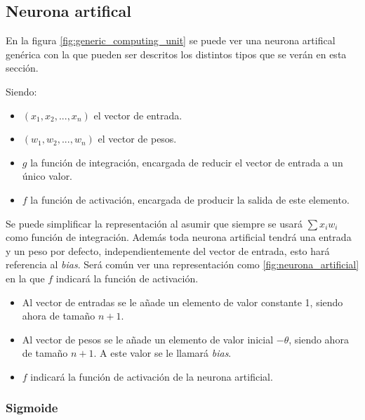\subsection{Neurona artifical}\label{subsec:neurona_artificial}

En la figura \ref{fig:generic_computing_unit} se puede ver una neurona artifical genérica con la que pueden ser descritos los distintos tipos que se verán en esta sección.


Siendo:
\begin{itemize}
\item $ (x_1, x_2, ...,x_n) $ el vector de entrada.
\item $ (w_1, w_2, ...,w_n) $ el vector de pesos.
\item $ g $ la función de integración, encargada de reducir el vector de entrada a un único valor.
\item $ f $ la función de activación, encargada de producir la salida de este elemento.
\end{itemize}

Se puede simplificar la representación al asumir que siempre se usará $ \sum x_i w_i $ como función de integración. Además toda neurona artificial tendrá una entrada y un peso por defecto, independientemente del vector de entrada, esto hará referencia al \textit{bias}. Será común ver una representación como \ref{fig:neurona_artificial} en la que $ f $ indicará la función de activación.


\begin{itemize}
\item Al vector de entradas se le añade un elemento de valor constante 1, siendo ahora de tamaño $ n+1 $.
\item Al vector de pesos se le añade un elemento de valor inicial $ -\theta $, siendo ahora de tamaño $ n+1 $. A este valor se le llamará \textit{bias}.
\item $ f $ indicará la función de activación de la neurona artificial.
\end{itemize}

\subsubsection{Sigmoide}\label{subsubsec:sigmoide}

